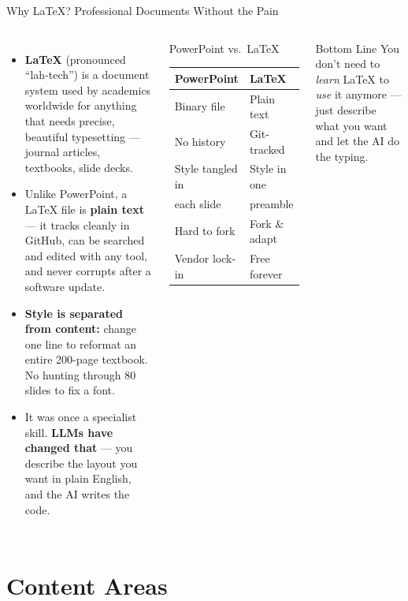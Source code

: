 \documentclass[aspectratio=169,10pt]{beamer}
\begin{document}
\begin{frame}{Why \LaTeX{}? Professional Documents Without the Pain}
\begin{columns}[c]
\begin{itemize}
  \item \textbf{\LaTeX{}} (pronounced ``lah-tech'') is a document system used by academics worldwide for anything that needs precise, beautiful typesetting --- journal articles, textbooks, slide decks.
  \item Unlike PowerPoint, a \LaTeX{} file is \textbf{plain text} --- it tracks cleanly in GitHub, can be searched and edited with any tool, and never corrupts after a software update.
  \item \textbf{Style is separated from content:} change one line to reformat an entire 200-page textbook. No hunting through 80 slides to fix a font.
  \item It was once a specialist skill. \textbf{LLMs have changed that} --- you describe the layout you want in plain English, and the AI writes the code.
\end{itemize}
\begin{block}{PowerPoint vs.\ \LaTeX{}}
\footnotesize
\begin{tabular}{ll}
\textbf{PowerPoint} & \textbf{\LaTeX{}} \\
\hline
Binary file & Plain text \\
No history & Git-tracked \\
Style tangled in & Style in one \\
\quad each slide & \quad preamble \\
Hard to fork & Fork \& adapt \\
Vendor lock-in & Free forever \\
\end{tabular}
\end{block}
\vspace{0.25em}
\begin{alertblock}{Bottom Line}
\footnotesize You don't need to \emph{learn} \LaTeX{} to \emph{use} it anymore --- just describe what you want and let the AI do the typing.
\end{alertblock}
\end{columns}
\end{frame}

\section{Content Areas}
\end{document}
